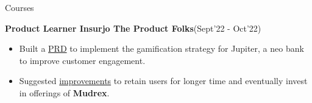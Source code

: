 \begin{rSection}{Courses}
\vspace{-.4cm}

%
%
%
%
%
%
%

\item{\bf Product Learner Insurjo The Product Folks}\hfill{(Sept'22 - Oct'22)}\\
[-0.4cm]

\begin{itemize}[leftmargin=*]

	\itemsep \sepval

	\item Built a \href{https://drive.google.com/file/d/1u6uiQsXEsm6QAMnPC-vQYK94N5bbqwSt/view?usp=share_link}{PRD} to implement the gamification strategy for Jupiter, a neo bank to improve customer engagement.

	\item Suggested \href{https://drive.google.com/file/d/1XgBXYlvwXj22Xdp10PC8FvQQhP0Q3tq4/view?usp=share_link}{improvements} to retain users for longer time and eventually invest in offerings of {\bf Mudrex}.


\end{itemize}
\end{rSection}
